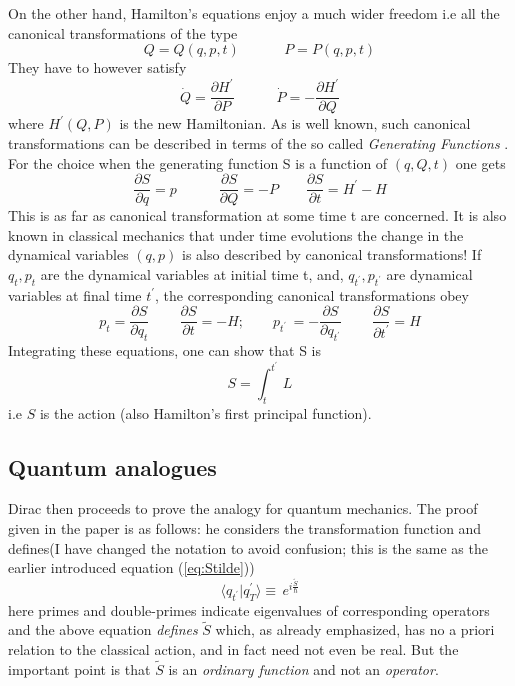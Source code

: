 \documentclass[12pt]{article}
\newcommand{\be}{\begin{equation}}
\newcommand{\ee}{\end{equation}}
\begin{document}
On the other hand, Hamilton's equations enjoy a much wider freedom i.e all the canonical transformations of the type
\be
\label{eq:canonical2}
Q = Q(q,p,t)\quad\quad\quad\,P = P(q,p,t)
\ee
They have to however satisfy
\be
\label{eq:canonical3}
{\dot Q} = \frac{\partial H^\prime}{\partial P}\quad\quad\quad{\dot P} = -\frac{\partial H^\prime}{\partial Q}
\ee
where $H^\prime(Q,P)$ is the new Hamiltonian. As is well known, such canonical transformations can be described in terms of the so called
{\it Generating Functions} \cite{landau}. For the choice when the generating function S is a function of $(q,Q,t)$ one gets
\be\label{eq: generating}
\frac{\partial S}{\partial q} = p\quad\quad\quad \frac{\partial S}{\partial Q} = - P\quad\quad \frac{\partial S}{\partial t} = H^\prime - H
\ee
This is as far as canonical transformation at some time t are concerned. It is also known in classical mechanics that under time evolutions
the change in the dynamical variables $(q,p)$ is also described by canonical transformations! If $q_t,p_t$ are the dynamical
variables at initial time t, and, $q_{t^\prime},p_{t^\prime}$ are dynamical variables at final time $t^\prime$, the corresponding
canonical transformations obey
\be
\label{eq:canonicalevol}
p_t = \frac{\partial S}{\partial q_t}\quad\quad\,\frac{\partial S}{\partial t} = - H;\quad\quad p_{t^\prime}\,
= - \frac{\partial S}{\partial q_{t^\prime}}\quad\quad\,\frac{\partial S}{\partial t^\prime} = H
\ee
Integrating these equations, one can show that S is
\be
\label{eq:principal}
S = \int_t^{t^\prime}\,L 
\ee
i.e $S$ is the action (also Hamilton's first principal function).

\subsection{Quantum analogues}
Dirac then proceeds to prove the analogy for quantum mechanics. The proof given in the paper \cite{diracpaper} is as follows: he considers
the transformation function and defines(I have changed the notation to avoid confusion; this is the same as the earlier introduced 
equation (\ref{eq:Stilde}))
\be
\label{eq:qanalog}
\langle q_{t^\prime}|q_T^{\prime}\rangle 
\equiv\, e^{i \frac{{\tilde S}}{\hbar}}
\ee
here primes and double-primes indicate eigenvalues of corresponding operators and the above equation {\it defines} ${\tilde S}$ which,
as already emphasized, has no a priori relation to the classical action, and in fact need not even be real. But the important point is 
that ${\tilde S}$ is an
\emph{ordinary function} and not an \emph{operator}.
\end{document}
